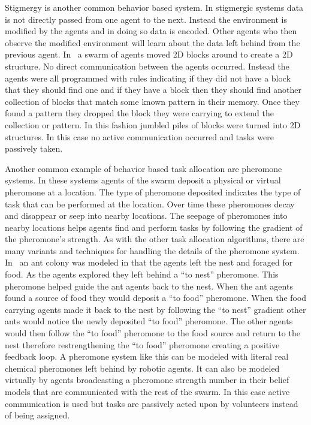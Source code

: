 Stigmergy is another common behavior based system.  In stigmergic systems data is not directly passed from one agent to the next.  Instead the environment is modified by the agents and in doing so data is encoded.  Other agents who then observe the modified environment will learn about the data left behind from the previous agent.  In~\citet{stigmergy_building} a swarm of agents moved 2D blocks around to create a 2D structure.  No direct communication between the agents occurred.  Instead the agents were all programmed with rules indicating if they did not have a block that they should find one and if they have a block then they should find another collection of blocks that match some known pattern in their memory.  Once they found a pattern they dropped the block they were carrying to extend the collection or pattern.  In this fashion jumbled piles of blocks were turned into 2D structures.  In this case no active communication occurred and tasks were passively taken.

Another common example of behavior based task allocation are pheromone systems.  In these systems agents of the swarm deposit a physical or virtual pheromone at a location.  The type of pheromone deposited indicates the type of task that can be performed at the location.  Over time these pheromones decay and disappear or seep into nearby locations.  The seepage of pheromones into nearby locations helps agents find and perform tasks by following the gradient of the pheromone's strength.  As with the other task allocation algorithms, there are many variants and techniques for handling the details of the pheromone system.  In~\citet{pheromone} an ant colony was modeled in that the agents left the nest and foraged for food.  As the agents explored they left behind a ``to nest'' pheromone.  This pheromone helped guide the ant agents back to the nest.  When the ant agents found a source of food they would deposit a ``to food'' pheromone.  When the food carrying agents made it back to the nest by following the ``to nest'' gradient other ants would notice the newly deposited ``to food'' pheromone.  The other agents would then follow the ``to food'' pheromone to the food source and return to the nest therefore restrengthening the ``to food'' pheromone creating a positive feedback loop.  A pheromone system like this can be modeled with literal real chemical pheromones left behind by robotic agents.  It can also be modeled virtually by agents broadcasting a pheromone strength number in their belief models that are communicated with the rest of the swarm.  In this case active communication is used but tasks are passively acted upon by volunteers instead of being assigned.
